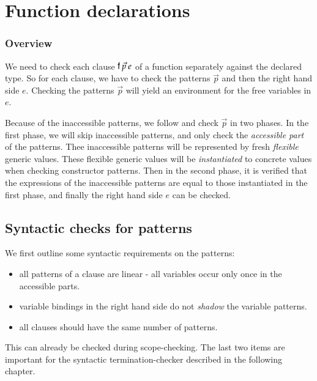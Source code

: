 \section{Function declarations}

\newcommand\checkcl[2]{#1\:\mathbf{checkcl}\:#2}
\newcommand\checkp[5]{(#1)\vdash#2\:\mathbf{chkP}\:#3\Rightarrow (#4),#5}
\newcommand\checkps[5]{(#1)\vdash#2\:\mathbf{chkPs}\:#3\Rightarrow (#4),#5}
\newcommand\checkinacc[4]{(#1)\vdash#2\:\mathbf{checkinacc}\:#3 : #4}
\newcommand\unify[5]{#1,#2\vdash#3\:\mathbf{inst}\:#4\Rightarrow #5}
\newcommand\unifylist[5]{#1,#2\vdash#3\:\mathbf{inst_{list}}\:#4\Rightarrow #5}


\subsubsection{Overview}
We need to check each clause $\mathsf{f} \: \vec{p} \: e$ of a function separately against the declared type.
So for each clause, we have to check the patterns $\vec{p}$ and then the right hand side $e$.
Checking the patterns $\vec{p}$ will yield an environment for the free variables in $e$.

Because of the inaccessible patterns, we follow \cite{norell:thesis} and check $\vec{p}$ in two phases.
In the first phase, we will skip inaccessible patterns, and only check the \emph{accessible part} of the patterns.
Thee inaccessible patterns will be represented by fresh \emph{flexible} generic values.
These flexible generic values will be \emph{instantiated} to concrete values when checking constructor patterns.
Then in the second phase, it is verified that the expressions of the inaccessible patterns are equal to those instantiated in the first phase, and finally the right hand side $e$ can be checked.

\newcommand{\subst}[2]{#1\{#2\}}
\newcommand{\substEnv}[2]{#1\{#2\}}
\newcommand{\compS}[2]{\opn{comp}\:#1\:#2}
\newcommand\ptv[2]{#1\Searrow#2}
\newcommand\ptvx{\opn{p2v}}
\newcommand\pstvs{\opn{p_{s}2v_{s}}}

\subsection{Syntactic checks for patterns}

We first outline some syntactic requirements on the patterns:
\begin{itemize}
\item
all patterns of a clause are linear - all variables occur only once in the accessible parts.
\item
variable bindings in the right hand side do not \emph{shadow} the variable patterns.
\item
all clauses should have the same number of patterns.
\end{itemize}
This can already be checked during scope-checking.
The last two items are important for the syntactic termination-checker described in the following chapter.

